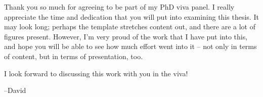 
\begin{preamble}

Thank you so much for agreeing to be part of my PhD viva panel. I really appreciate the time and dedication that you will put into examining this thesis. It may look long; perhaps the template stretches content out, and there are a lot of figures present. However, I'm very proud of the work that I have put into this, and hope you will be able to see how much effort went into it -- not only in terms of content, but in terms of presentation, too.

I look forward to discussing this work with you in the viva!

--David

\end{preamble}